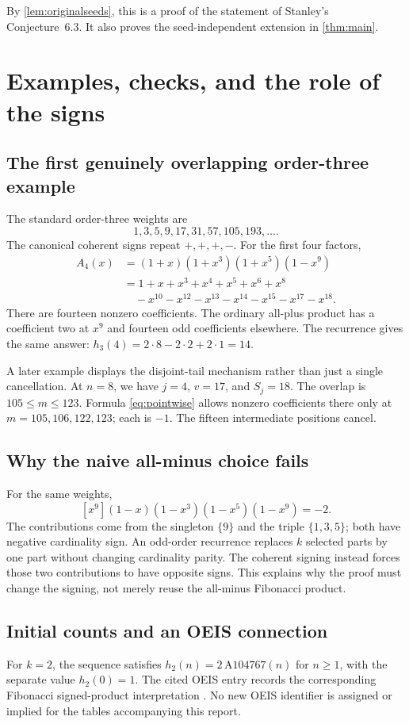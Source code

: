 \documentclass[11pt]{article}
\numberwithin{equation}{section}
\theoremstyle{definition}
\theoremstyle{remark}
\begin{document}
By \cref{lem:originalseeds}, this is a proof of the statement of Stanley's
Conjecture~6.3. It also proves the seed-independent extension in
\cref{thm:main}.

\section{Examples, checks, and the role of the signs}
\subsection{The first genuinely overlapping order-three example}
The standard order-three weights are
\[
 1,3,5,9,17,31,57,105,193,\ldots.
\]
The canonical coherent signs repeat $+,+,+,-$. For the first four factors,
\begin{align*}
 A_4(x)&=(1+x)(1+x^3)(1+x^5)(1-x^9)\\
 &=1+x+x^3+x^4+x^5+x^6+x^8\\
 &\quad-x^{10}-x^{12}-x^{13}-x^{14}-x^{15}-x^{17}-x^{18}.
\end{align*}
There are fourteen nonzero coefficients. The ordinary all-plus product has
a coefficient two at $x^9$ and fourteen odd coefficients elsewhere.
The recurrence gives the same answer:
$h_3(4)=2\cdot8-2\cdot2+2\cdot1=14$.

A later example displays the disjoint-tail mechanism rather than just a
single cancellation. At $n=8$, we have $j=4$, $v=17$, and $S_j=18$.
The overlap is $105\le m\le123$. Formula \eqref{eq:pointwise} allows
nonzero coefficients there only at $m=105,106,122,123$; each is $-1$.
The fifteen intermediate positions cancel.

\subsection{Why the naive all-minus choice fails}
For the same weights,
\[
 [x^9](1-x)(1-x^3)(1-x^5)(1-x^9)=-2.
\]
The contributions come from the singleton $\{9\}$ and the triple
$\{1,3,5\}$; both have negative cardinality sign. An odd-order recurrence
replaces $k$ selected parts by one part without changing cardinality
parity. The coherent signing instead forces those two contributions to
have opposite signs. This explains why the proof must change the signing,
not merely reuse the all-minus Fibonacci product.

\subsection{Initial counts and an OEIS connection}

For $k=2$, the sequence satisfies
$h_2(n)=2\,\mathrm{A104767}(n)$ for $n\ge1$, with the separate value
$h_2(0)=1$. The cited OEIS entry records the corresponding Fibonacci
signed-product interpretation \cite{OEIS}. No new OEIS identifier is
assigned or implied for the tables accompanying this report.
\end{document}

